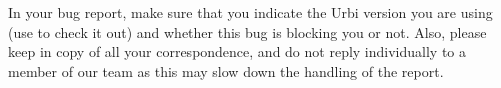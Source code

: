 In your bug report, make sure that you indicate the Urbi version you
are using (use  to check it out) and whether this
bug is blocking you or not. Also, please keep
 in copy of all your
correspondence, and do not reply individually to a member of our team
as this may slow down the handling of the report.


\ifx\ifHtml\undefined\else
  \let\subsubsection\subsubsectionSave
\fi


